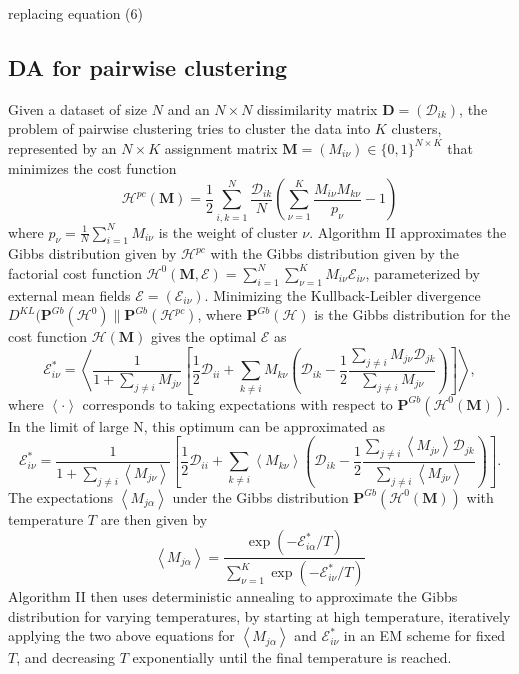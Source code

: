 \documentclass[9pt,parskip]{scrartcl}
\begin{document}
\begin{multicols*}{4}
replacing equation (6)

\subsection*{DA for pairwise clustering}
Given a dataset of size $N$ and an $N \times N$ dissimilarity matrix $\mathbf{D} = (\mathcal{D}_{ik})$, the problem of pairwise clustering tries to cluster the data into $K$ clusters, represented by an $N \times K$ assignment matrix $\mathbf{M} = (M_{i\nu}) \in \{0,1\}^{N\times K}$ that minimizes the cost function
$$\mathcal{H}^{pc}(\mathbf{M}) = \frac{1}{2} \sum_{i,k=1}^N \frac{\mathcal{D}_{ik}}{N} \left(\sum_{\nu=1}^K \frac{M_{i\nu} M_{k\nu}}{p_\nu} - 1\right)$$
where $p_\nu = \frac{1}{N} \sum_{i=1}^N M_{i\nu}$ is the weight of cluster $\nu$. Algorithm II approximates the Gibbs distribution given by $\mathcal{H}^{pc}$ with the Gibbs distribution given by the factorial cost function $\mathcal{H}^{0}(\mathbf{M}, \mathcal{E}) = \sum_{i=1}^N \sum_{\nu=1}^K M_{i\nu} \mathcal{E}_{i\nu}$, parameterized by external mean fields $\mathcal{E} = (\mathcal{E}_{i\nu})$. Minimizing the Kullback-Leibler divergence $D^{KL}(\mathbf{P}^{Gb}(\mathcal{H}^0)\|\mathbf{P}^{Gb}(\mathcal{H}^{pc})$, where $\mathbf{P}^{Gb}(\mathcal{H})$ is the Gibbs distribution for the cost function $\mathcal{H}(\mathbf{M})$ gives the optimal $\mathcal{E}$ as 
$$\mathcal{E}^*_{i\nu} = \left\langle \frac{1}{1+\sum_{j \neq i} M_{j\nu}} \left[ \frac{1}{2} \mathcal{D}_{ii} + \sum_{k \neq i} M_{k\nu} \left( \mathcal{D}_{ik} - \frac{1}{2} \frac{\sum_{j \neq i} M_{j\nu} \mathcal{D}_{jk}}{\sum_{j \neq i} M_{j\nu}} \right) \right] \right\rangle,$$
where $\left\langle\cdot\right\rangle$ corresponds to taking expectations with respect to $\mathbf{P}^{Gb}(\mathcal{H}^0(\mathbf{M}))$. In the limit of large N, this optimum can be approximated as
$$\mathcal{E}^*_{i\nu} = \frac{1}{1+\sum_{j \neq i} \left\langle M_{j\nu} \right\rangle} \left[ \frac{1}{2} \mathcal{D}_{ii} + \sum_{k \neq i} \left\langle M_{k\nu} \right\rangle \left( \mathcal{D}_{ik} - \frac{1}{2} \frac{\sum_{j \neq i} \left\langle M_{j\nu} \right\rangle \mathcal{D}_{jk}}{\sum_{j \neq i} \left\langle M_{j\nu} \right\rangle} \right) \right].$$
The expectations $\left\langle M_{j\alpha} \right\rangle$ under the Gibbs distribution $\mathbf{P}^{Gb}(\mathcal{H}^0(\mathbf{M}))$ with temperature $T$ are then given by
$$\left\langle M_{j\alpha} \right\rangle = \frac{\exp(-\mathcal{E}^*_{i\alpha}/T)}{\sum_{\nu=1}^K \exp(-\mathcal{E}^*_{i\nu}/T)}$$
Algorithm II then uses deterministic annealing to approximate the Gibbs distribution for varying temperatures, by starting at high temperature, iteratively applying the two above equations for $\left\langle M_{j\alpha} \right\rangle$ and $\mathcal{E}^*_{i\nu}$ in an EM scheme for fixed $T$, and decreasing $T$ exponentially until the final temperature is reached. 


\end{multicols*}
\end{document}
